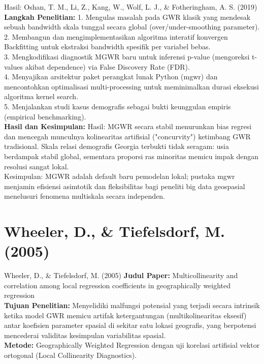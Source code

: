 \documentclass{beamer}
\begin{document}
\begin{frame}[allowframebreaks]{Hasil: Oshan, T. M., Li, Z., Kang, W., Wolf, L. J., \& Fotheringham, A. S. (2019)}
\textbf{Langkah Penelitian:} 1. Mengulas masalah pada GWR klasik yang mendesak sebuah bandwidth skala tunggal secara global (over/under-smoothing parameter).\\ 2. Membangun dan mengimplementasikan algoritma interatif konvergen Backfitting untuk ekstraksi bandwidth spesifik per variabel bebas.\\ 3. Mengkodifikasi diagnostik MGWR baru untuk inferensi p-value (mengoreksi t-values akibat dependence) via False Discovery Rate (FDR).\\ 4. Menyajikan arsitektur paket perangkat lunak Python (mgwr) dan mencontohkan optimalisasi multi-processing untuk meminimalkan durasi eksekusi algoritma kernel search.\\ 5. Menjalankan studi kasus demografis sebagai bukti keunggulan empiris (empirical benchmarking). \\[0.3cm]
\textbf{Hasil dan Kesimpulan:} Hasil: MGWR secara stabil menurunkan bias regresi dan mencegah munculnya kolinearitas artifisial ("concurvity") ketimbang GWR tradisional. Skala relasi demografis Georgia terbukti tidak seragam: usia berdampak stabil global, sementara proporsi ras minoritas memicu impak dengan resolusi sangat lokal.\\ Kesimpulan: MGWR adalah default baru pemodelan lokal; pustaka mgwr menjamin efisiensi asimtotik dan fleksibilitas bagi peneliti big data geospasial menelusuri fenomena multiskala secara independen.
\end{frame}

\section{Wheeler, D., \& Tiefelsdorf, M. (2005)}
\begin{frame}[allowframebreaks]{Wheeler, D., \& Tiefelsdorf, M. (2005)}
\textbf{Judul Paper:} Multicollinearity and correlation among local regression coefficients in geographically weighted regression \\[0.3cm]
\textbf{Tujuan Penelitian:} Menyelidiki malfungsi potensial yang terjadi secara intrinsik ketika model GWR memicu artifak ketergantungan (multikolinearitas eksesif) antar koefisien parameter spasial di sekitar satu lokasi geografis, yang berpotensi mencederai validitas kesimpulan variabilitas spasial. \\[0.3cm]
\textbf{Metode:} Geographically Weighted Regression dengan uji korelasi artifisial vektor ortogonal (Local Collinearity Diagnostics).
\end{frame}
\end{document}
